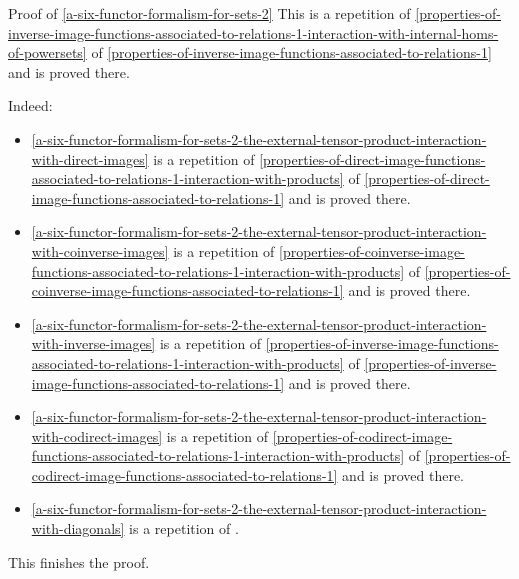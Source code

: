 \begin{Proof}{Proof of \cref{a-six-functor-formalism-for-sets-2}}
    This is a repetition of \cref{properties-of-inverse-image-functions-associated-to-relations-1-interaction-with-internal-homs-of-powersets} of \cref{properties-of-inverse-image-functions-associated-to-relations-1} and is proved there.


    Indeed:
    \begin{itemize}
        \item \cref{a-six-functor-formalism-for-sets-2-the-external-tensor-product-interaction-with-direct-images} is a repetition of \cref{properties-of-direct-image-functions-associated-to-relations-1-interaction-with-products} of \cref{properties-of-direct-image-functions-associated-to-relations-1} and is proved there.
        \item \cref{a-six-functor-formalism-for-sets-2-the-external-tensor-product-interaction-with-coinverse-images} is a repetition of \cref{properties-of-coinverse-image-functions-associated-to-relations-1-interaction-with-products} of \cref{properties-of-coinverse-image-functions-associated-to-relations-1} and is proved there.
        \item \cref{a-six-functor-formalism-for-sets-2-the-external-tensor-product-interaction-with-inverse-images} is a repetition of \cref{properties-of-inverse-image-functions-associated-to-relations-1-interaction-with-products} of \cref{properties-of-inverse-image-functions-associated-to-relations-1} and is proved there.
        \item \cref{a-six-functor-formalism-for-sets-2-the-external-tensor-product-interaction-with-codirect-images} is a repetition of \cref{properties-of-codirect-image-functions-associated-to-relations-1-interaction-with-products} of \cref{properties-of-codirect-image-functions-associated-to-relations-1} and is proved there.
        \item \cref{a-six-functor-formalism-for-sets-2-the-external-tensor-product-interaction-with-diagonals} is a repetition of .
    \end{itemize}
    This finishes the proof.


\end{Proof}
